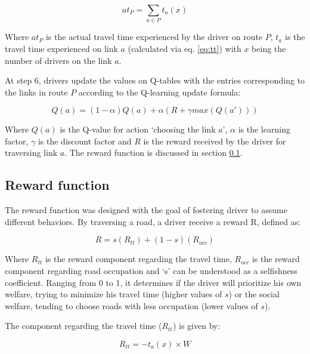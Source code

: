 \documentclass[12pt]{article}
\begin{document}
\begin{equation}
\label{eq:att}
at_P = \sum_{a \in P} t_a(x)
\end{equation}

Where $at_P$ is the actual travel time experienced by the driver on route $P$, $t_a$ is the travel time experienced on link $a$ (calculated via eq. \eqref{eq:tt}) with $x$ being the number of drivers on the link $a$.

At step 6, drivers update the values on Q-tables with the entries corresponding to the links in route $P$ according to the Q-learning update formula:

\begin{equation}
\label{eq:qlearning}
Q(a) = (1 - \alpha) Q(a) + \alpha (R + \gamma max(Q(a')))
\end{equation}

Where $Q(a)$ is the Q-value for action `choosing the link $a$', $\alpha$ is the learning factor, $\gamma$ is the discount factor and $R$ is the reward received by the driver for traversing link $a$. The reward function is discussed in section \ref{sec:reward}. %

\subsection{Reward function}
\label{sec:reward}

The reward function was designed with the goal of fostering driver to assume different behaviors. By traversing a road, a driver receive a reward R, defined as:

\begin{equation}
\label{eq:rByCombination}
R = s(R_{tt}) + (1 - s)(R_{occ})
\end{equation}

Where $R_{tt}$ is the reward component regarding the travel time, $R_{occ}$ is the reward component regarding road occupation and `s' can be understood as a selfishness coefficient. Ranging from 0 to 1, it determines if the driver will prioritize his own welfare, trying to minimize his travel time (higher values of $s$) or the social welfare, tending to choose roads with less occupation (lower values of $s$).


The component regarding the travel time ($R_{tt}$) is given by:

\begin{equation}
\label{eq:rByTravelTime}
R_{tt} = - t_a(x) \times W
\end{equation}
\end{document}
